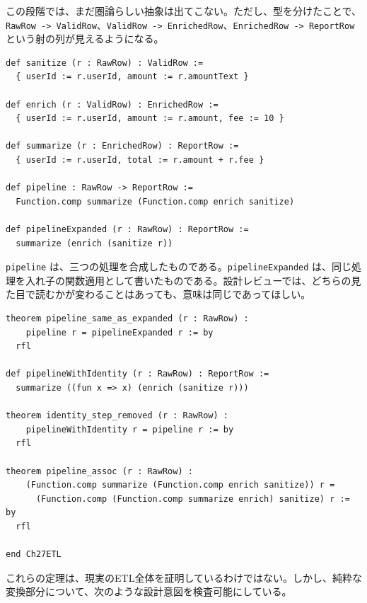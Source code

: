 この段階では、まだ圏論らしい抽象は出てこない。ただし、型を分けたことで、\texttt{RawRow -> ValidRow}、\texttt{ValidRow -> EnrichedRow}、\texttt{EnrichedRow -> ReportRow} という射の列が見えるようになる。

\begin{listing}[htbp]
\begin{verbatim}
def sanitize (r : RawRow) : ValidRow :=
  { userId := r.userId, amount := r.amountText }

def enrich (r : ValidRow) : EnrichedRow :=
  { userId := r.userId, amount := r.amount, fee := 10 }

def summarize (r : EnrichedRow) : ReportRow :=
  { userId := r.userId, total := r.amount + r.fee }

def pipeline : RawRow -> ReportRow :=
  Function.comp summarize (Function.comp enrich sanitize)

def pipelineExpanded (r : RawRow) : ReportRow :=
  summarize (enrich (sanitize r))
\end{verbatim}
\caption{ETLステージを関数として定義する}
\label{lst:ch27-etl-functions}
\end{listing}

\texttt{pipeline} は、三つの処理を合成したものである。\texttt{pipelineExpanded} は、同じ処理を入れ子の関数適用として書いたものである。設計レビューでは、どちらの見た目で読むかが変わることはあっても、意味は同じであってほしい。

\begin{listing}[htbp]
\begin{verbatim}
theorem pipeline_same_as_expanded (r : RawRow) :
    pipeline r = pipelineExpanded r := by
  rfl

def pipelineWithIdentity (r : RawRow) : ReportRow :=
  summarize ((fun x => x) (enrich (sanitize r)))

theorem identity_step_removed (r : RawRow) :
    pipelineWithIdentity r = pipeline r := by
  rfl

theorem pipeline_assoc (r : RawRow) :
    (Function.comp summarize (Function.comp enrich sanitize)) r =
      (Function.comp (Function.comp summarize enrich) sanitize) r := by
  rfl

end Ch27ETL
\end{verbatim}
\caption{合成したパイプラインと展開した処理が一致する}
\label{lst:ch27-etl-proofs}
\end{listing}

これらの定理は、現実のETL全体を証明しているわけではない。しかし、純粋な変換部分について、次のような設計意図を検査可能にしている。

